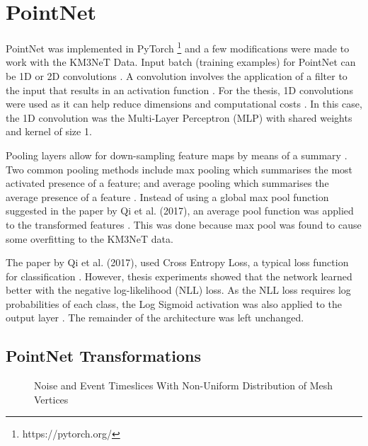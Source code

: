 \section{PointNet}
PointNet was implemented in PyTorch \footnote{https://pytorch.org/} and a few modifications were made to work with the KM3NeT Data. Input batch (training examples) for PointNet can be 1D or 2D convolutions \cite{qi2017pointnet}. A convolution involves the application of a filter to the input that results in an activation function \cite{goodfellow2016convolutional}. For the thesis, 1D convolutions were used as it can help reduce dimensions and computational costs \cite{lin2013network}. In this case, the 1D convolution was the Multi-Layer Perceptron (MLP) with shared weights and kernel of size 1.

Pooling layers allow for down-sampling feature maps by means of a summary \cite{goodfellow2016convolutional}. Two common pooling methods include max pooling which summarises the most activated presence of a feature; and average pooling which summarises the average presence of a feature \cite{goodfellow2016convolutional}. Instead of using a global max pool function suggested in the paper by Qi et al. (2017), an average pool function was applied to the transformed features \cite{qi2017pointnet}. This was done because max pool was found to cause some overfitting to the KM3NeT data.

The paper by Qi et al. (2017), used Cross Entropy Loss, a typical loss function for classification \cite{qi2017pointnet}. However, thesis experiments showed that the network learned better with the negative log-likelihood (NLL) loss. As the NLL loss requires log probabilities of each class, the Log Sigmoid activation was also applied to the output layer \cite{paszke2019pytorch}. The remainder of the architecture was left unchanged. 

\subsection{PointNet Transformations}
\begin{figure}[ht!]   
\centering
{}
\hspace{0.01cm}
\caption[]{Noise and Event Timeslices With Non-Uniform Distribution of Mesh Vertices}
\label{fig:vertices}
\end{figure}


